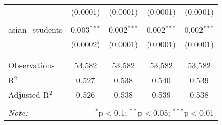 \begin{table}[!htbp]
\begin{tabular}{@{\extracolsep{-2pt}}lcccc}
  & (0.0001) & (0.0001) & (0.0001) & (0.0001) \\ 
  & & & & \\ 
 asian\_students & 0.003$^{***}$ & 0.002$^{***}$ & 0.002$^{***}$ & 0.002$^{***}$ \\ 
  & (0.0002) & (0.0001) & (0.0001) & (0.0001) \\ 
  & & & & \\ 
\hline \\[-1.8ex] 
Observations & 53,582 & 53,582 & 53,582 & 53,582 \\ 
R$^{2}$ & 0.527 & 0.538 & 0.540 & 0.539 \\ 
Adjusted R$^{2}$ & 0.526 & 0.538 & 0.539 & 0.538 \\ 
\hline 
\hline \\[-1.8ex] 
\textit{Note:}  & \multicolumn{4}{r}{$^{*}$p$<$0.1; $^{**}$p$<$0.05; $^{***}$p$<$0.01} \\ 
\end{tabular} 
\end{table} 

